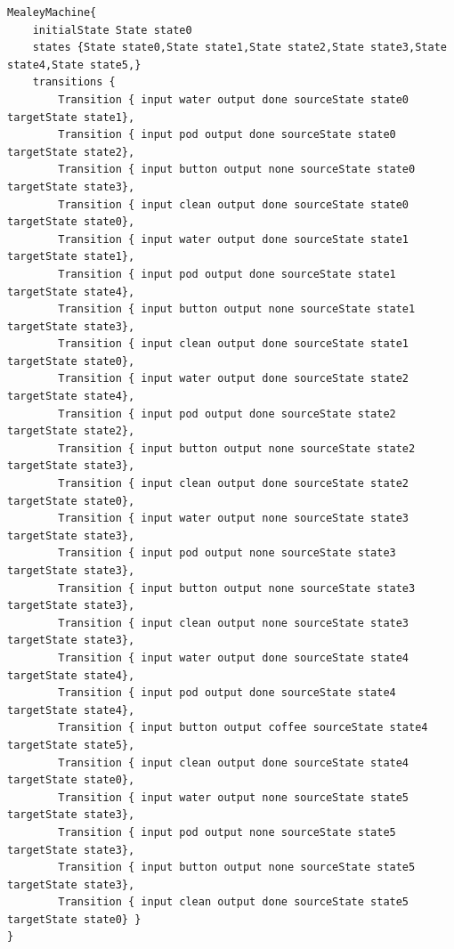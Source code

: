 \begin{lstlisting}[caption=The output MealyMachine after running the implemented DHC algorithm with the input seen in Listing \ref{li:coffeemealy}.,label=li:coffeedhcret]
MealeyMachine{
	initialState State state0
	states {State state0,State state1,State state2,State state3,State state4,State state5,}
	transitions {
		Transition { input water output done sourceState state0 targetState state1},
		Transition { input pod output done sourceState state0 targetState state2},
		Transition { input button output none sourceState state0 targetState state3},
		Transition { input clean output done sourceState state0 targetState state0},
		Transition { input water output done sourceState state1 targetState state1},
		Transition { input pod output done sourceState state1 targetState state4},
		Transition { input button output none sourceState state1 targetState state3},
		Transition { input clean output done sourceState state1 targetState state0},
		Transition { input water output done sourceState state2 targetState state4},
		Transition { input pod output done sourceState state2 targetState state2},
		Transition { input button output none sourceState state2 targetState state3},
		Transition { input clean output done sourceState state2 targetState state0},
		Transition { input water output none sourceState state3 targetState state3},
		Transition { input pod output none sourceState state3 targetState state3},
		Transition { input button output none sourceState state3 targetState state3},
		Transition { input clean output none sourceState state3 targetState state3},
		Transition { input water output done sourceState state4 targetState state4},
		Transition { input pod output done sourceState state4 targetState state4},
		Transition { input button output coffee sourceState state4 targetState state5},
		Transition { input clean output done sourceState state4 targetState state0},
		Transition { input water output none sourceState state5 targetState state3},
		Transition { input pod output none sourceState state5 targetState state3},
		Transition { input button output none sourceState state5 targetState state3},
		Transition { input clean output done sourceState state5 targetState state0} }
}
\end{lstlisting}

